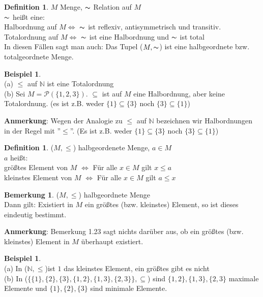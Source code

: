\documentclass[10pt,a4paper,numbers=endperiod]{scrartcl}
\theoremstyle{definition}
\newtheorem{defi}[satz]{Definition}
\newtheorem{bem}[satz]{Bemerkung}
\newtheorem{bsp}[satz]{Beispiel}
\begin{document}
\begin{defi}
	$M$ Menge, $\thicksim$ Relation auf $M$\\
	$\thicksim$ heißt eine:\\
	Halbordnung auf $M \Leftrightarrow$ $\thicksim$ ist reflexiv, antisymmetrisch und transitiv.\\
	Totalordnung auf $M \Leftrightarrow$ $\thicksim$ ist eine Halbordnung und $\thicksim$ ist total\\
	In diesen Fällen sagt man auch: Das Tupel ($M, \thicksim$) ist eine halbgeordnete bzw. totalgeordnete Menge. 
\end{defi}

\begin{bsp}
	$ $ \\
	(a) $\leq$ auf $\mathbb{N}$ ist eine Totalordnung\\
	(b) Sei $M = \mathcal{P}(\{1,2,3\})$. $\subseteq$ ist auf $M$ eine Halbordnung, aber keine Totalordnung. (es ist z.B. weder $\{1\} \subseteq \{3\}$ noch $\{3\} \subseteq \{1\}$)\\
\end{bsp}
\textbf{Anmerkung}: Wegen der Analogie zu $\leq$ auf $\mathbb{N}$ bezeichnen wir Halbordnungen in der Regel mit ''$\leq$''. (Es ist z.B. weder $\{1\} \subseteq \{3\}$ noch $\{3\} \subseteq \{1\}$)

\begin{defi}
	($M, \leq$) halbgeordenete Menge, $a \in M$\\
	$a$ heißt:\\
	größtes Element von $M$ $\Leftrightarrow$ Für alle $x \in M$ gilt $x \leq a$\\
	kleinstes Element von $M$ $\Leftrightarrow$ Für alle $x \in M$ gilt $a \leq x$
\end{defi}

\begin{bem}
	($M, \leq$) halbgeordnete Menge\\
	Dann gilt: Existiert in $M$ ein größtes (bzw. kleinstes) Element, so ist dieses eindeutig bestimmt.
\end{bem}

\textbf{Anmerkung}: Bemerkung 1.23 sagt nichts darüber aus, ob ein größtes (bzw. kleinstes) Element in $M$ überhaupt existiert.

\begin{bsp}
	$ $ \\
	(a) In ($\mathbb{N}, \leq$)ist $1$ das kleinstes Element, ein größtes gibt es nicht\\
	(b) In ($\{\{1\}, \{2\}, \{3\}, \{1,2\}, \{1,3\},\{2,3\}\}, \subseteq$) sind $\{1,2\},\{1,3\},\{2,3\}$ maximale Elemente und $\{1\}, \{2\},\{3\}$ sind minimale Elemente.
\end{bsp}
\end{document}
